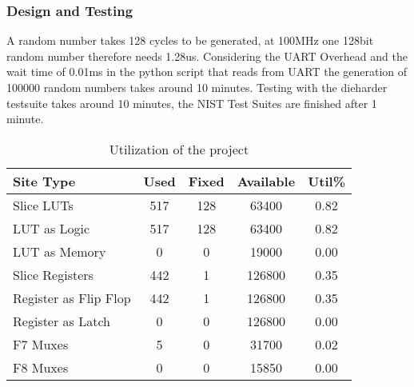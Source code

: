 \subsubsection{Design and Testing}
A random number takes 128 cycles to be generated, at 100MHz one 128bit random number
therefore needs 1.28us. Considering the UART Overhead and the wait time of 0.01ms in the
python script that reads from UART the generation of 100000 random numbers takes around 10
minutes. Testing with the dieharder testsuite takes around 10 minutes, the NIST Test
Suites are finished after 1 minute.

\begin{table}[htp]
	\centering
	\caption{Utilization of the project}
	\label{tbl:utilResults}
	\begin{tabular}{lcccc}

		\hline
        Site Type& Used & Fixed & Available & Util\% \\
		\hline
 Slice LUTs              &  517 &   128 &     63400 &  0.82 \\
   LUT as Logic          &  517 &   128 &     63400 &  0.82 \\
   LUT as Memory         &    0 &     0 &     19000 &  0.00 \\
 Slice Registers         &  442 &     1 &    126800 &  0.35 \\
   Register as Flip Flop &  442 &     1 &    126800 &  0.35 \\
   Register as Latch     &    0 &     0 &    126800 &  0.00 \\
 F7 Muxes                &    5 &     0 &     31700 &  0.02 \\
 F8 Muxes                &    0 &     0 &     15850 &  0.00 \\
		\hline

	\end{tabular}

\end{table}
